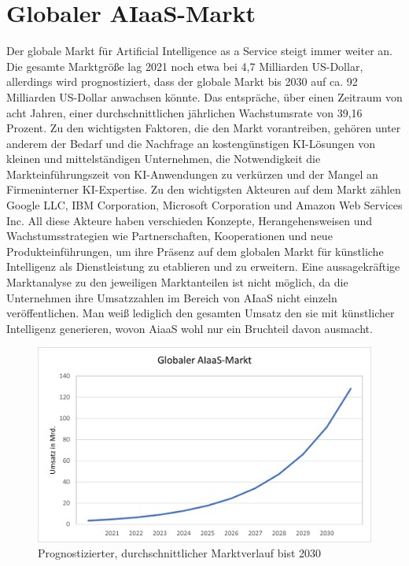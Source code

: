 \newpage
\section{Globaler AIaaS-Markt}
Der globale Markt für Artificial Intelligence as a Service steigt immer weiter an. Die gesamte Marktgröße lag 2021 noch etwa bei 4,7 Milliarden US-Dollar, allerdings wird prognostiziert, dass der globale Markt bis 2030 auf ca. 92 Milliarden US-Dollar anwachsen könnte. Das entspräche, über einen Zeitraum von acht Jahren, einer durchschnittlichen jährlichen Wachstumsrate von 39,16 Prozent. Zu den wichtigsten Faktoren, die den Markt vorantreiben, gehören unter anderem der Bedarf und die Nachfrage an kostengünstigen KI-Lösungen von kleinen und mittelständigen Unternehmen, die Notwendigkeit die Markteinführungszeit von KI-Anwendungen zu verkürzen und der Mangel an Firmeninterner KI-Expertise. Zu den wichtigsten Akteuren auf dem Markt zählen Google LLC, IBM Corporation, Microsoft Corporation und Amazon Web Services Inc. All diese Akteure haben verschieden Konzepte, Herangehensweisen und Wachstumsstrategien wie Partnerschaften, Kooperationen und neue Produkteinführungen, um ihre Präsenz auf dem globalen Markt für künstliche Intelligenz als Dienstleistung zu etablieren und zu erweitern. Eine aussagekräftige Marktanalyse zu den jeweiligen Marktanteilen ist nicht möglich, da die Unternehmen ihre Umsatzzahlen im Bereich von AIaaS nicht einzeln veröffentlichen. Man weiß lediglich den gesamten Umsatz den sie mit künstlicher Intelligenz generieren, wovon AiaaS wohl nur ein Bruchteil davon ausmacht. \cite[vgl.][]{PR.2021} \\

\begin{figure}
  \centering
  \includegraphics[width=\textwidth]{bilder/AIaaS-Markt.png}
  \caption{Prognostizierter, durchschnittlicher Marktverlauf bist 2030}
  \label{fig:aiaasmarkt}
\end{figure}


